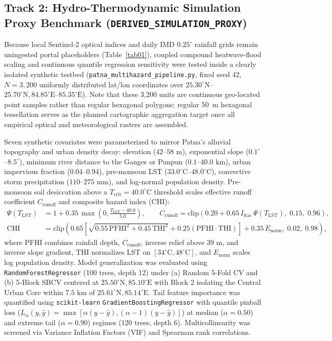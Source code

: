 \documentclass[OA,linenum]{InterPore}
\begin{document}
\subsection{Track 2: Hydro-Thermodynamic Simulation Proxy Benchmark (\texttt{DERIVED\_SIMULATION\_PROXY})}

Because local Sentinel-2 optical indices and daily IMD $0.25^\circ$ rainfall grids remain uningested portal placeholders (Table~\ref{tab01}), coupled compound heatwave-flood scaling and continuous quantile regression sensitivity were tested inside a clearly isolated synthetic testbed (\texttt{patna\_multihazard\_pipeline.py}, fixed seed 42, $N = 3,200$ uniformly distributed lat/lon coordinates over $25.30^\circ\text{N}$--$25.70^\circ\text{N}, 84.85^\circ\text{E}$--$85.35^\circ\text{E}$). Note that these 3,200 units are continuous geo-located point samples rather than regular hexagonal polygons; regular 50~m hexagonal tessellation \cite{Boni2025, Pittore2023} serves as the planned cartographic aggregation target once all empirical optical and meteorological rasters are assembled.

Seven synthetic covariates were parameterized to mirror Patna's alluvial topography and urban density decay: elevation ($42$--$58\text{ m}$), exponential slope ($0.1^\circ$--$8.5^\circ$), minimum river distance to the Ganges or Punpun ($0.1$--$40.0\text{ km}$), urban impervious fraction ($0.04$--$0.94$), pre-monsoon LST ($33.0^\circ\text{C}$--$48.0^\circ\text{C}$), convective storm precipitation ($110$--$275\text{ mm}$), and log-normal population density. Pre-monsoon soil desiccation above a $T_{\text{crit}} = 40.0^\circ\text{C}$ threshold scales effective runoff coefficient $C_{\text{runoff}}$ and composite hazard index ($\text{CHI}$):
\begin{align}
    \Psi(T_{\text{LST}}) &= 1 + 0.35\,\max\!\left(0, \frac{T_{\text{LST}} - 40.0}{5.0}\right), \qquad C_{\text{runoff}} = \text{clip}\!\left(0.20 + 0.65\,I_{\text{frac}}\,\Psi(T_{\text{LST}}),\; 0.15,\; 0.96\right), \\
    \text{CHI} &= \text{clip}\!\left(0.65\left[\sqrt{0.55\,\text{PFHI}^2 + 0.45\,\text{THI}^2} + 0.25(\text{PFHI}\cdot\text{THI})\right] + 0.35\,E_{\text{norm}},\; 0.02,\; 0.98\right),
\end{align}
where PFHI combines rainfall depth, $C_{\text{runoff}}$, inverse relief above $39\text{ m}$, and inverse slope gradient, THI normalizes LST on $[34^\circ\text{C}, 48^\circ\text{C}]$, and $E_{\text{norm}}$ scales log population density. Model generalization was evaluated using \texttt{RandomForestRegressor} (100 trees, depth 12) under (a) Random 5-Fold CV and (b) 5-Block SBCV centered at $25.50^\circ\text{N}, 85.10^\circ\text{E}$ with Block 2 isolating the Central Urban Core within $7.5\text{ km}$ of $25.61^\circ\text{N}, 85.14^\circ\text{E}$. Tail feature importance was quantified using \texttt{scikit-learn} \cite{Pedregosa2011} \texttt{GradientBoostingRegressor} with quantile pinball loss ($L_\alpha(y, \hat{y}) = \max[\alpha(y-\hat{y}), (\alpha-1)(y-\hat{y})]$) at median ($\alpha = 0.50$) and extreme tail ($\alpha = 0.90$) regimes (120 trees, depth 6). Multicollinearity was screened via Variance Inflation Factors (VIF) and Spearman rank correlations.
\end{document}
